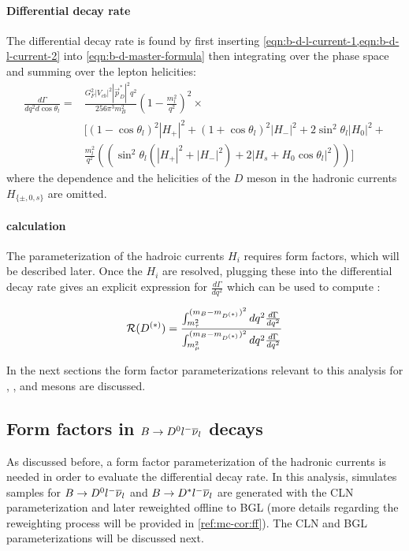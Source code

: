 \paragraph{Differential decay rate}
The differential decay rate is found by first inserting
\cref{eqn:b-d-l-current-1,eqn:b-d-l-current-2}
into \cref{eqn:b-d-master-formula} then integrating over the phase space and
summing over the lepton helicities:
\begin{align}
    \frac{d\Gamma}{d q^2 d\cos\theta_l} =&
    \frac{G^2_F |V_{cb}|^2 | \vec{p}^*_D|^2 q^2}{256 \pi^3 m^2_B}
    \left(1 - \frac{m^2_l}{q^2}\right)^2 \times
    \nonumber \\
    &\bigg[
        (1 - \cos\theta_l)^2 |H_+|^2 + (1 + \cos\theta_l)^2 |H_-|^2 +
        2 \sin^2\theta_l |H_0|^2 +
    \nonumber \\
    & \frac{m^2_l}{q^2} \left(
        (\sin^2\theta_l(|H_+|^2 + |H_-|^2) + 2|H_s + H_0 \cos\theta_l|^2)
    \right)
    \bigg]
    \label{eqn:ff-ps}
\end{align}
where the \qSq dependence and the helicities of the $D$ meson in the hadronic
currents $H_{\{\pm,0,s\}}$ are omitted.

\paragraph{\RDX calculation}
The parameterization of the hadroic currents $H_i$ requires form factors,
which will be described later.
Once the $H_i$ are resolved,
plugging these into the differential decay rate gives
an explicit expression for $\frac{d\Gamma}{d q^2}$
which can be used to compute \RDX:

\begin{equation}
    \mathcal{R}(D^{(*)}) = \frac{
        \int_{m^2_\tau}^{(m_B - m_{D^{(*)}})^2} d q^2 \frac{d\Gamma}{d q^2}
    }{
        \int_{m^2_\mu}^{(m_B - m_{D^{(*)}})^2} d q^2 \frac{d\Gamma}{d q^2}
    }
\end{equation}

In the next sections the form factor parameterizations relevant to this analysis
for \Dz, \Dstar, and \Dstst mesons are discussed.


\subsection{Form factors in $B \rightarrow {\ensuremath{{D}^0}}{\ensuremath{l^-}}{\ensuremath{{\overline{\nu}}_l}}$ decays}
\label{ref:theory:ff-d0}

As discussed before,
a form factor parameterization of the hadronic currents is needed in order to
evaluate the differential decay rate.
In this analysis,
simulates samples for $B \rightarrow {\ensuremath{{D}^0}} {\ensuremath{l^-}}{\ensuremath{{\overline{\nu}}_l}}$
and $B \rightarrow {\ensuremath{{D}^*}}{\ensuremath{l^-}}{\ensuremath{{\overline{\nu}}_l}}$
are generated with the CLN
parameterization and later reweighted offline to BGL
(more details regarding the reweighting process will be provided in
\cref{ref:mc-cor:ff}).
The CLN and BGL parameterizations will be discussed next.

